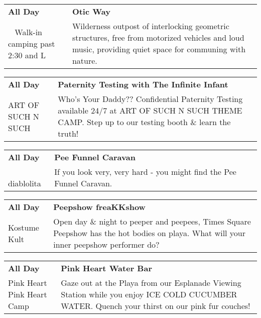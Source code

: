 \begin{tabular}{ p{1in} p{2.2in} }
    \textbf{All Day} & \textbf{Otic Way} \\
    ~ \newline Walk-in camping past 2:30 and L & Wilderness outpost of interlocking geometric structures, free from motorized vehicles and loud music, providing quiet space for communing with nature. \\
    \hline 
\end{tabular}
    
\begin{tabular}{ p{1in} p{2.2in} }
    \textbf{All Day} & \textbf{Paternity Testing with The Infinite Infant} \\
    ART OF SUCH N SUCH \newline  & Who's Your Daddy?? Confidential Paternity Testing available 24/7 at ART OF SUCH N SUCH THEME CAMP. Step up to our testing booth \& learn the truth! \\
    \hline 
\end{tabular}
    
\begin{tabular}{ p{1in} p{2.2in} }
    \textbf{All Day} & \textbf{Pee Funnel Caravan} \\
    ~ \newline diablolita & If you look very, very hard - you might find the Pee Funnel Caravan. \\
    \hline 
\end{tabular}
    
\begin{tabular}{ p{1in} p{2.2in} }
    \textbf{All Day} & \textbf{Peepshow freaKKshow} \\
    Kostume Kult \newline  & Open day \& night to peeper and peepees, Times Square Peepshow has the hot bodies on playa. What will your inner peepshow performer do? \\
    \hline 
\end{tabular}
    
\begin{tabular}{ p{1in} p{2.2in} }
    \textbf{All Day} & \textbf{Pink Heart Water Bar} \\
    Pink Heart \newline Pink Heart Camp & Gaze out at the Playa from our Esplanade Viewing Station while you enjoy ICE COLD CUCUMBER WATER. Quench your thirst on our pink fur couches! \\
    \hline 
\end{tabular}
    
